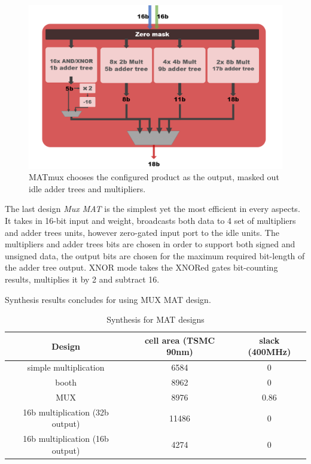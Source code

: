 \begin{figure}[h]
    \centering
    \includegraphics[width=1\linewidth]{inc/4_proposed_architecture/figure/MATmux.png}
    \caption{MATmux chooses the configured product as the output, masked out idle adder trees and multipliers.}
    \label{fig:MATmux}
\end{figure}
The last design \textit{Mux MAT} is the simplest yet the most efficient in every aspects. It takes in 16-bit input and weight, broadcasts both data to 4 set of multipliers and adder trees units, however zero-gated input port to the idle units. The multipliers and adder trees bits are chosen in order to support both signed and unsigned data, the output bits are chosen for the maximum required bit-length of the adder tree output. XNOR mode takes the XNORed gates bit-counting results, multiplies it by 2 and subtract 16.

Synthesis results concludes for using MUX MAT design. 
\begin{table}[h]
    \caption{Synthesis for MAT designs}
    \label{tab:pad_cons}
    \centering
    \footnotesize 
        \begin{tabular}{c|cc}
        \toprule
        Design &  cell area (TSMC 90nm) & slack (400MHz)\\
        \midrule
        simple multiplication & 6584 & 0\\
        booth & 8962 & 0\\
        MUX & 8976 & 0.86\\
        16b multiplication (32b output) & 11486 & 0\\
        16b multiplication (16b output) & 4274 & 0\\
        \bottomrule
        \end{tabular}
\end{table}

